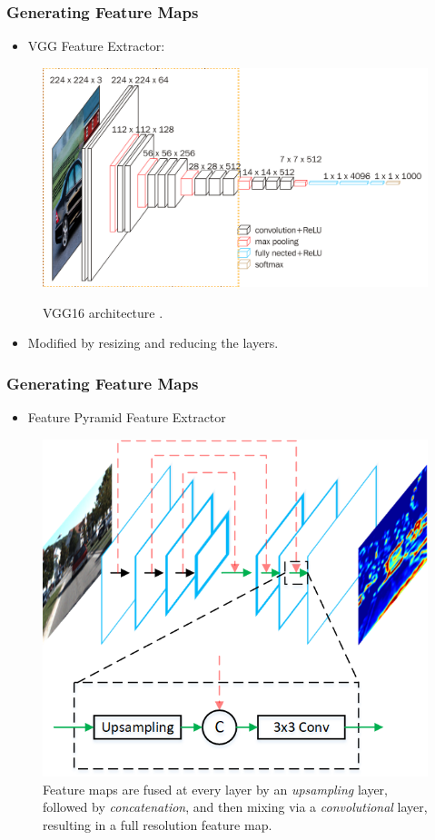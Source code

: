 \documentclass[10pt,fleqn,unknownkeysallowed]{beamer}
\begin{document}
\begin{frame}
	\frametitle{Generating Feature Maps}
	\begin{itemize}
		\item{VGG Feature Extractor:}
	\end{itemize}
	\begin{figure}
		\begin{center}
			\includegraphics[width=0.7\linewidth]{images/vgg16} \\
			\caption{VGG16 architecture \cite{vgg_arch}.}
		\end{center}
	\end{figure}
	\begin{itemize}
		\item{Modified by resizing and reducing the layers.}
	\end{itemize}
\end{frame}

\begin{frame}
	\frametitle{Generating Feature Maps}
	\begin{itemize}
		\item{Feature Pyramid Feature Extractor}
	\end{itemize}
	\begin{figure}
	\begin{center}
		\includegraphics[width=0.5\linewidth]{images/Pyramid_Feature.png}
		\caption{Feature maps are fused at every layer by an \textit{upsampling} layer, followed by \textit{concatenation}, and then mixing via a \textit{convolutional} layer, resulting in a full resolution feature map.}
	\end{center}
	\end{figure}
\end{frame}
\end{document}
